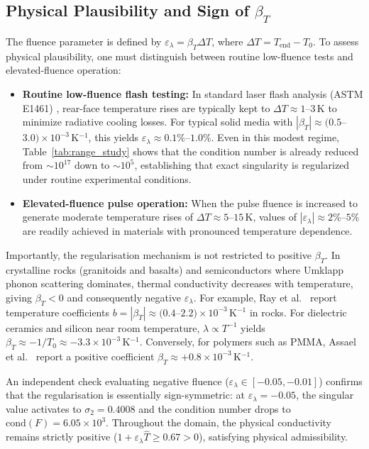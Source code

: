 \documentclass[preprint,12pt,a4paper]{elsarticle}
\begin{document}
\subsection{Physical Plausibility and Sign of $\beta_T$}
The fluence parameter is defined by $\varepsilon_\lambda = \beta_T \Delta T$, where $\Delta T = T_{\mathrm{end}} - T_0$. To assess physical plausibility, one must distinguish between routine low-fluence tests and elevated-fluence operation:
\begin{itemize}
  \item \textbf{Routine low-fluence flash testing:} In standard laser flash analysis (ASTM E1461) \cite{ASTME1461}, rear-face temperature rises are typically kept to $\Delta T \approx 1$--$3\,\si{\kelvin}$ to minimize radiative cooling losses. For typical solid media with $|\beta_T| \approx (0.5$--$3.0) \times 10^{-3}\,\si{\kelvin^{-1}}$, this yields $\varepsilon_\lambda \approx 0.1\%$--$1.0\%$. Even in this modest regime, Table~\ref{tab:range_study} shows that the condition number is already reduced from $\sim 10^{17}$ down to $\sim 10^5$, establishing that exact singularity is regularized under routine experimental conditions.
  \item \textbf{Elevated-fluence pulse operation:} When the pulse fluence is increased to generate moderate temperature rises of $\Delta T \approx 5$--$15\,\si{\kelvin}$, values of $|\varepsilon_\lambda| \approx 2\%$--$5\%$ are readily achieved in materials with pronounced temperature dependence.
\end{itemize}

Importantly, the regularisation mechanism is not restricted to positive $\beta_T$. In crystalline rocks (granitoids and basalts) and semiconductors where Umklapp phonon scattering dominates, thermal conductivity decreases with temperature, giving $\beta_T < 0$ and consequently negative $\varepsilon_\lambda$. For example, Ray et al.~\cite{Ray2021} report temperature coefficients $b = |\beta_T| \approx (0.4$--$2.2) \times 10^{-3}\,\si{\kelvin^{-1}}$ in rocks. For dielectric ceramics and silicon near room temperature, $\lambda \propto T^{-1}$ yields $\beta_T \approx -1/T_0 \approx -3.3 \times 10^{-3}\,\si{\kelvin^{-1}}$. Conversely, for polymers such as PMMA, Assael et al.~\cite{Assael2005} report a positive coefficient $\beta_T \approx +0.8 \times 10^{-3}\,\si{\kelvin^{-1}}$. 

An independent check evaluating negative fluence ($\varepsilon_\lambda \in [-0.05, -0.01]$) confirms that the regularisation is essentially sign-symmetric: at $\varepsilon_\lambda = -0.05$, the singular value activates to $\sigma_2 = 0.4008$ and the condition number drops to $\mathrm{cond}(F) = 6.05 \times 10^3$. Throughout the domain, the physical conductivity remains strictly positive ($1 + \varepsilon_\lambda \hat{T} \ge 0.67 > 0$), satisfying physical admissibility.
\end{document}

